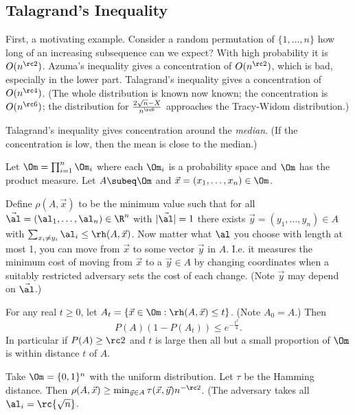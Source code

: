 
\subsection{Talagrand's Inequality}
First, a motivating example. 
Consider a random permutation of $\{1,\ldots, n\}$ how long of an increasing subsequence can we expect? With high probability it is $O(n^{\rc 2})$. Azuma's inequality gives a concentration of $O(n^{\rc2})$, which is bad, especially in the lower part. Talagrand's inequality gives a concentration of $O(n^{\rc4})$. (The whole distribution is known now known; the concentration is $O(n^{\rc 6})$; the distribution for $\frac{2\sqrt n-X}{n^{\rc 6}}$ approaches the Tracy-Widom distribution.)

Talagrand's inequality gives concentration around the {\it median}. (If the concentration is low, then the mean is close to the median.)

\begin{thm}%
Let $\Om=\prod_{i=1}^n \Om_i$ where each $\Om_i$ is a probability space and $\Om$ has the product measure. Let $A\subeq \Om$ and $\vec{x}=(x_1,\ldots, x_n)\in \Om$. 

Define $\rho(A,\vec x)$ to be the minimum value such that for all $\vec{\al}=(\al_1,\ldots, \al_n)\in \R^n$ with $|\vec{\al}|=1$ there exists $\vec y=(y_1,\ldots, y_n)\in A$ with $\sum_{x_i\ne y_i} \al_i\le \rh(A,\vec x)$. Now matter what $\al$ you choose with length at most 1, you can move from $\vec x$ to some vector $\vec y$ in $A$. I.e. it measures the minimum cost of moving from $\vec{x}$ to a $\vec y\in A$ by changing coordinates when a suitably restricted adversary sets the cost of each change. (Note $\vec y$ may depend on $\vec{\al}$.)

For any real $t\ge 0$, let $A_t=\{\vec x\in \Om:\rh(A,\vec x)\le t\}$. (Note $A_0=A$.) Then
\[
P(A)(1-P(A_t))\le e^{-\frac{t^2}4}.
\]
In particular if $P(A)\ge \rc 2$ and $t$ is large then all but a small proportion of $\Om$ is within distance $t$ of $A$.
\end{thm}

Take $\Om=\{0,1\}^n$ with the uniform distribution. Let $\tau$ be the Hamming distance. Then $\rho(A,\vec x)\ge \min_{\vec y\in A} \tau(\vec x,\vec y)n^{-\rc 2}$. (The adversary takes all $\al_i=\rc{\sqrt n}$.

